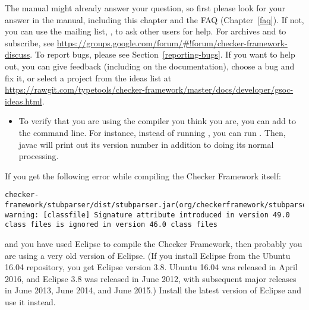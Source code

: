 \htmlhr
{}

\begin{sloppypar}
The manual might already answer your question, so first please look for
your answer in the manual,
including this chapter and the FAQ (Chapter~\ref{faq}).
If not, you can use the mailing list,
, to ask other users for
help.  For archives and to subscribe, see \url{https://groups.google.com/forum/#!forum/checker-framework-discuss}.
To report bugs, please see Section~\ref{reporting-bugs}.
If you want to help out, you can give feedback (including on the
documentation), choose a bug and fix it, or select a
project from the ideas list at
\url{https://rawgit.com/typetools/checker-framework/master/docs/developer/gsoc-ideas.html}.
\end{sloppypar}



\begin{itemize}
\item
To verify that you are using the compiler you think you are, you can add
 to the command line.  For instance, instead of running
, you can run .  Then, javac will print out its version number in addition
to doing its normal processing.

\end{itemize}



If you get the following error while compiling the Checker Framework itself:

\begin{smaller}
\begin{Verbatim}
checker-framework/stubparser/dist/stubparser.jar(org/checkerframework/stubparser/ast/CompilationUnit.class):
warning: [classfile] Signature attribute introduced in version 49.0 class files is ignored in version 46.0 class files
\end{Verbatim}
\end{smaller}

\noindent
and you have used Eclipse to compile the Checker Framework, then probably
you are using a very old version of Eclipse.  (If you
install Eclipse from the Ubuntu 16.04 repository, you get Eclipse version
3.8.  Ubuntu 16.04 was released in April 2016, and Eclipse 3.8 was released
in June 2012, with subsequent major releases in June 2013, June 2014, and
June 2015.)
Install the latest version of Eclipse and use it instead.


